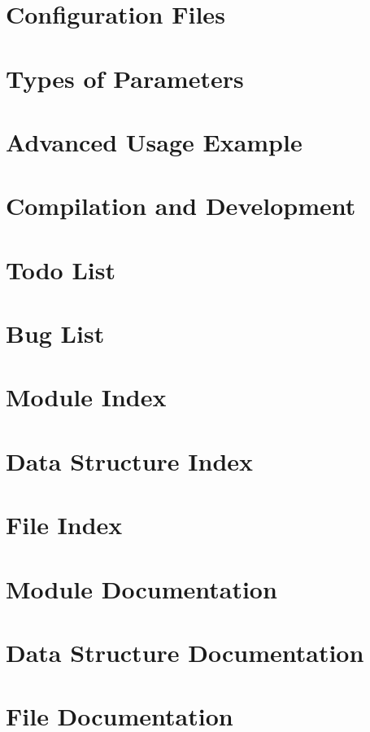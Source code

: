 \documentclass{article}
\begin{document}
\section{Configuration Files}
\label{config_files}
\hypertarget{config_files}{}

\section{Types of Parameters}
\label{parameter_types}
\hypertarget{parameter_types}{}

\section{Advanced Usage Example}
\label{advanced_example}
\hypertarget{advanced_example}{}

\section{Compilation and Development}
\label{development}
\hypertarget{development}{}

\section{Todo List}
\label{todo}
\hypertarget{todo}{}

\section{Bug List}
\label{bug}
\hypertarget{bug}{}

\section{Module Index}

\section{Data Structure Index}

\section{File Index}

\section{Module Documentation}









\section{Data Structure Documentation}


\section{File Documentation}

\printindex
\end{document}
